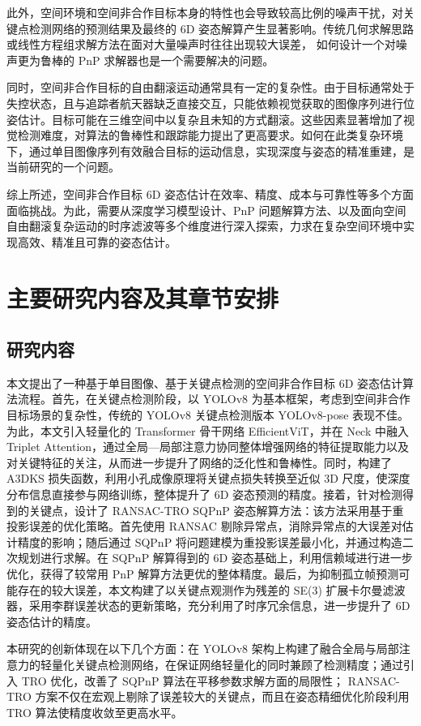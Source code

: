 此外，空间环境和空间非合作目标本身的特性也会导致较高比例的噪声干扰，对关键点检测网络的预测结果及最终的 6D 姿态解算产生显著影响。传统几何求解思路或线性方程组求解方法在面对大量噪声时往往出现较大误差，
如何设计一个对噪声更为鲁棒的 PnP 求解器也是一个需要解决的问题。

同时，空间非合作目标的自由翻滚运动通常具有一定的复杂性。由于目标通常处于失控状态，且与追踪者航天器缺乏直接交互，只能依赖视觉获取的图像序列进行位姿估计。目标可能在三维空间中以复杂且未知的方式翻滚。这些因素显著增加了视觉检测难度，对算法的鲁棒性和跟踪能力提出了更高要求。如何在此类复杂环境下，通过单目图像序列有效融合目标的运动信息，实现深度与姿态的精准重建，是当前研究的一个问题。

综上所述，空间非合作目标 6D 姿态估计在效率、精度、成本与可靠性等多个方面面临挑战。为此，需要从深度学习模型设计、PnP 问题解算方法、以及面向空间自由翻滚复杂运动的时序滤波等多个维度进行深入探索，力求在复杂空间环境中实现高效、精准且可靠的姿态估计。

\section{主要研究内容及其章节安排}
\subsection{研究内容}
本文提出了一种基于单目图像、基于关键点检测的空间非合作目标 6D 姿态估计算法流程。首先，在关键点检测阶段，以 YOLOv8 为基本框架，考虑到空间非合作目标场景的复杂性，传统的 YOLOv8 关键点检测版本 YOLOv8-pose 表现不佳。为此，本文引入轻量化的 Transformer 骨干网络 EfficientViT，并在 Neck 中融入 Triplet Attention，通过全局—局部注意力协同整体增强网络的特征提取能力以及对关键特征的关注，从而进一步提升了网络的泛化性和鲁棒性。同时，构建了 A3DKS 损失函数，利用小孔成像原理将关键点损失转换至近似 3D 尺度，使深度分布信息直接参与网络训练，整体提升了 6D 姿态预测的精度。接着，针对检测得到的关键点，设计了 RANSAC-TRO SQPnP 姿态解算方法：该方法采用基于重投影误差的优化策略。首先使用 RANSAC 剔除异常点，消除异常点的大误差对估计精度的影响；随后通过 SQPnP 将问题建模为重投影误差最小化，并通过构造二次规划进行求解。在 SQPnP 解算得到的 6D 姿态基础上，利用信赖域进行进一步优化，获得了较常用 PnP 解算方法更优的整体精度。最后，为抑制孤立帧预测可能存在的较大误差，本文构建了以关键点观测作为残差的 SE(3) 扩展卡尔曼滤波器，采用李群误差状态的更新策略，充分利用了时序冗余信息，进一步提升了 6D 姿态估计的精度。

本研究的创新体现在以下几个方面：在 YOLOv8 架构上构建了融合全局与局部注意力的轻量化关键点检测网络，在保证网络轻量化的同时兼顾了检测精度；通过引入 TRO 优化，改善了 SQPnP 算法在平移参数求解方面的局限性； RANSAC-TRO 方案不仅在宏观上剔除了误差较大的关键点，而且在姿态精细优化阶段利用 TRO 算法使精度收敛至更高水平。
